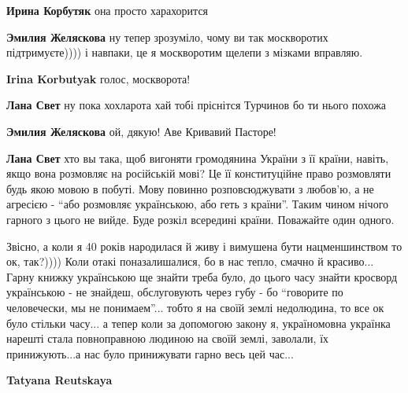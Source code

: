 \begin{itemize}
\begin{itemize}
\textbf{Ирина Корбутяк} она просто харахорится

\textbf{Эмилия Желяскова} ну тепер зрозуміло, чому ви так москворотих
підтримуєте)))) і навпаки, це я москворотим щелепи з мізками вправляю.

\textbf{Irina Korbutyak} голос, москворота!

\textbf{Лана Свет} ну пока хохларота хай тобі пріснітся Турчинов бо ти нього похожа

\textbf{Эмилия Желяскова} ой, дякую! Аве Кривавий Пасторе!

\par

\textbf{Лана Свет} хто вы така, щоб вигоняти громодянина України з її країни,
навіть, якщо вона розмовляє на російській мові? Це її конституційне право
розмовляти будь якою мовою в побуті. Мову повинно розповсюджувати з любов'ю, а
не агресією - \enquote{або розмовляє українською, або геть з країни}. Таким чином
нічого гарного з цього не вийде. Буде розкіл всередині країни. Поважайте один
одного.

\end{itemize}


Звісно, а коли я 40 років народилася й живу і вимушена бути нацменшинством то
ок, так?)))) Коли отакі поназалишалися, бо в нас тепло, смачно й красиво...
Гарну книжку українською ще знайти треба було, до цього часу знайти кросворд
українською - не знайдеш, обслуговують через губу - бо \enquote{говорите по
человечески, мы не понимаем}... тобто я на своїй землі недолюдина, то все ок
було стільки часу... а тепер коли за допомогою закону я, україномовна українка
нарешті стала повноправною людиною на своїй землі, заволали, їх принижують...а
нас було принижувати гарно весь цей час...

\begin{itemize}
\textbf{Tatyana Reutskaya} 


\end{itemize}
\end{itemize}
